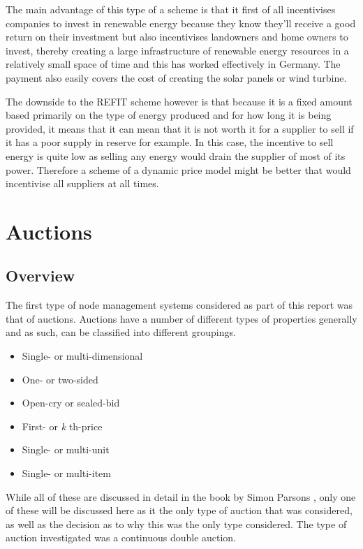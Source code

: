 \documentclass[a4paper, notitlepage]{report}
\begin{document}
The main advantage of this type of a scheme is that it first of all incentivises
companies to invest in renewable energy because they know they'll receive a good
return on their investment but also incentivises landowners and home owners to
invest, thereby creating a large infrastructure of renewable energy resources in
a relatively small space of time and this has worked effectively in Germany. The
payment also easily covers the cost of creating the solar panels or wind
turbine.

The downside to the REFIT scheme however is that because it is a fixed amount
based primarily on the type of energy produced and for how long it is being
provided, it means that it can mean that it is not worth it for a supplier to
sell if it has a poor supply in reserve for example. In this case, the incentive
to sell energy is quite low as selling any energy would drain the supplier of
most of its power. Therefore a scheme of a dynamic price model might be better
that would incentivise all suppliers at all times.
\chapter{Auctions}
\label{sec:orge2215a2}
\section{Overview}
\label{sec:org5c3a1d1}
The first type of node management systems considered as part of this report was
that of auctions. Auctions have a number of different types of properties
generally and as such, can be classified into different groupings.

\begin{itemize}
\item Single- or multi-dimensional
\item One- or two-sided
\item Open-cry or sealed-bid
\item First- or \emph{k} th-price
\item Single- or multi-unit
\item Single- or multi-item
\end{itemize}

While all of these are discussed in detail in the book by Simon Parsons
\cite{parsons2011auctions}, only one of these will be discussed here as it the
only type of auction that was considered, as well as the decision as to why this
was the only type considered. The type of auction investigated was a continuous
double auction.
\end{document}
